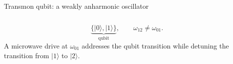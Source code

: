 \begin{frame}{Transmon qubit: a weakly anharmonic oscillator}
\begin{columns}[T,onlytextwidth]

    \vspace{-0.7em}
    \[
      \underbrace{\{|0\rangle,|1\rangle\}}_{\text{qubit}},
      \qquad \omega_{12}\neq\omega_{01}.
    \]
    A microwave drive at $\omega_{01}$ addresses the qubit transition while
    detuning the transition from $|1\rangle$ to $|2\rangle$.
  \end{columns}
\end{frame}
